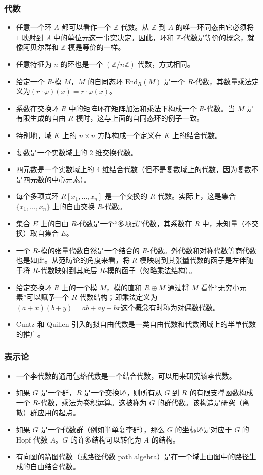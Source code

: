 \subsubsection{代数}
\begin{itemize}
\item 任意一个环 $A$ 都可以看作一个 $\mathbb{Z}$-代数。从 $\mathbb{Z}$ 到 $A$ 的唯一环同态由它必须将 $1$ 映射到 $A$ 中的单位元这一事实决定。因此，环和 $\mathbb{Z}$-代数是等价的概念，就像阿贝尔群和 $\mathbb{Z}$-模是等价的一样。
\item 任意特征为 $n$ 的环也是一个 $(\mathbb{Z}/n\mathbb{Z})$-代数，方式相同。
\item 给定一个 $R$-模 $M$，$M$ 的自同态环 $\mathrm{End}_R(M)$ 是一个 $R$-代数，其数量乘法定义为$(r \cdot \varphi)(x) = r \cdot \varphi(x)$。
\item 系数在交换环 $R$ 中的矩阵环在矩阵加法和乘法下构成一个 $R$-代数。当 $M$ 是有限生成的自由 $R$-模时，这与上面的自同态环的例子一致。
\item 特别地，域 $K$ 上的 $n \times n$ 方阵构成一个定义在 $K$ 上的结合代数。
\item 复数是一个实数域上的 2 维交换代数。
\item 四元数是一个实数域上的 4 维结合代数（但不是复数域上的代数，因为复数不是四元数的中心元素）。
\item 每个多项式环 $R[x_1, \ldots, x_n]$ 是一个交换的 $R$-代数。实际上，这是集合 $\{x_1, \ldots, x_n\}$ 上的自由交换 $R$-代数。
\item 集合 $E$ 上的自由 $R$-代数是一个“多项式”代数，其系数在 $R$ 中，未知量（不交换）取自集合 $E$。
\item 一个 $R$-模的张量代数自然是一个结合的 $R$-代数。外代数和对称代数等商代数也是如此。从范畴论的角度来看，将 $R$-模映射到其张量代数的函子是左伴随于将 $R$-代数映射到其底层 $R$-模的函子（忽略乘法结构）。
\item 给定交换环 $R$ 上的一个模 $M$，模的直和 $R \oplus M$ 通过将 $M$ 看作“无穷小元素”可以赋予一个 $R$-代数结构；即乘法定义为$(a + x)(b + y) = ab + ay + bx$这个概念有时称为对偶数代数。
\item Cuntz 和 Quillen 引入的拟自由代数是一类自由代数和代数闭域上的半单代数的推广。
\end{itemize}
\subsubsection{表示论}
\begin{itemize}
\item 一个李代数的通用包络代数是一个结合代数，可以用来研究该李代数。
\item 如果 $G$ 是一个群，$R$ 是一个交换环，则所有从 $G$ 到 $R$ 的有限支撑函数构成一个 $R$-代数，乘法为卷积运算。这被称为 $G$ 的群代数。该构造是研究（离散）群应用的起点。
\item 如果 $G$ 是一个代数群（例如半单复李群），那么 $G$ 的坐标环是对应于 $G$ 的 Hopf 代数 $A$。$G$ 的许多结构可以转化为 $A$ 的结构。
\item 有向图的箭图代数（或路径代数 path algebra）是在一个域上由图中的路径生成的自由结合代数。
\end{itemize}
